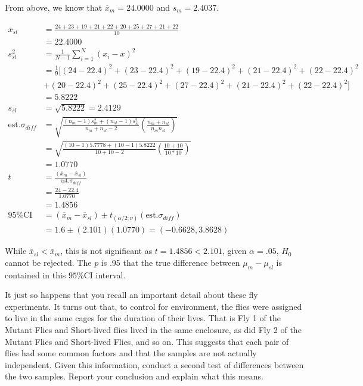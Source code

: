 \documentclass[onecolumn,10pt]{jhwhw}
\begin{document}
From above, we know that $\overline{x}_m = 24.0000$ and $s_m = 2.4037$.

\begin{equation*}
\begin{split}
\overline{x}_{sl} & = \frac{24 + 23 + 19 + 21 + 22 + 20 + 25 + 27 + 21 + 22}{10} \\
             & = 22.4000 \\
s^2_{sl} & = \frac{1}{N-1} \sum_{i=1}^N (x_i - \overline{x})^2 \\
    & = \frac{1}{9} [(24-22.4)^2 + (23-22.4)^2 + (19-22.4)^2 + (21-22.4)^2 + (22-22.4)^2  \\
    & + (20-22.4)^2 + (25-22.4)^2 + (27-22.4)^2 + (21-22.4)^2 + (22-22.4)^2] \\
    & = 5.8222 \\
s_{sl} & = \sqrt{5.8222} = 2.4129\\
%
\mbox{est.} \sigma_{diff} & = \sqrt{\frac{(n_m-1)s^2_m + (n_{sl}-1)s^2_{sl}}{n_m + n_{sl} - 2} \left( \frac{n_m + n_{sl}}{n_m n_{sl}} \right)} \\
& = \sqrt{\frac{(10-1)5.7778 + (10-1)5.8222}{10 + 10 - 2} \left( \frac{10 + 10}{10*10} \right)} \\
& = 1.0770\\
%
t & = \frac{\left( \overline{x}_m - \overline{x}_{sl} \right)}{\mbox{est.} \sigma_{diff}} \\
  & = \frac{24 - 22.4}{1.0770} \\
  & = 1.4856\\
%
\mbox{95\% CI} & = (\overline{x}_m - \overline{x}_{sl}) \pm t_{(\alpha/2;\nu)} (\mbox{est.} \sigma_{diff}) \\
& = 1.6 \pm (2.101) (1.0770) = (-0.6628,3.8628)
\end{split}
\end{equation*}

While $\overline{x}_{sl} < \overline{x}_m$, this is not significant as $t = 1.4856 < 2.101$, given $\alpha = .05$, $H_0$ cannot be rejected. The $p$ is .95 that the true difference between $\mu_m - \mu_{sl}$ is contained in this $\mbox{95\% CI}$ interval.

\problem{}
It just so happens that you recall an important detail about these fly experiments. It turns out that, to control for environment, the flies were assigned to live in the same cages for the duration of their lives. That is Fly 1 of the Mutant Flies and Short-lived flies lived in the same enclosure, as did Fly 2 of the Mutant Flies and Short-lived Flies, and so on. This suggests that each pair of flies had some common factors and that the samples are not actually independent. Given this information, conduct a second test of differences between the two samples. Report your conclusion and explain what this means.
\end{document}
